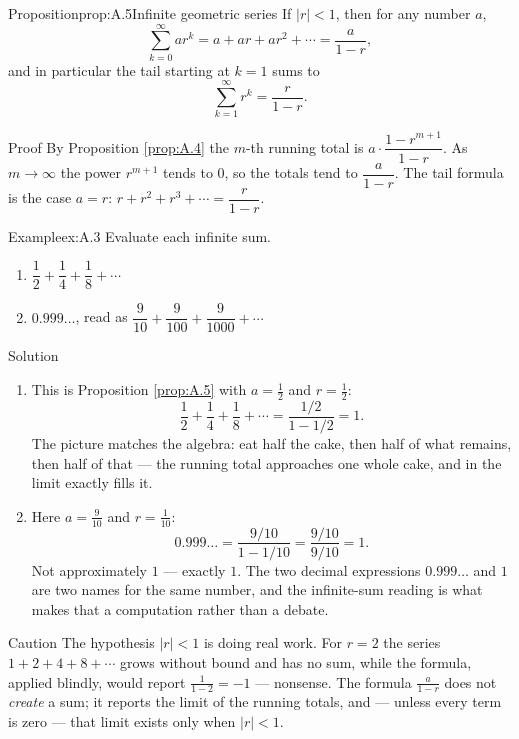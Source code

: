 \documentclass[a4paper,12pt,oneside]{memoir}
\begin{document}
\begin{envproposition}{Proposition}{prop:A.5}{Infinite geometric series}
If \(\lvert r \rvert < 1\), then for any number \(a\), \[ \sum_{k = 0}^{\infty} a r^{k} = a + ar + ar^{2} + \cdots = \frac{a}{1 - r}, \] and in particular the tail starting at \(k = 1\) sums to \[ \sum_{k = 1}^{\infty} r^{k} = \frac{r}{1 - r}. \]
\end{envproposition}
\begin{envproof}{Proof}{}{}
By Proposition \ref{prop:A.4} the \(m\)-th running total is \(a \cdot \dfrac{1 - r^{m+1}}{1 - r}\). As \(m \to \infty\) the power \(r^{m+1}\) tends to \(0\), so the totals tend to \(\dfrac{a}{1 - r}\). The tail formula is the case \(a = r\): \(r + r^{2} + r^{3} + \cdots = \dfrac{r}{1 - r}\). \qedmark
\end{envproof}
\begin{workedexample}
\begin{envexample}{Example}{ex:A.3}{}
Evaluate each infinite sum.

\begin{enumerate}
  \item \(\dfrac{1}{2} + \dfrac{1}{4} + \dfrac{1}{8} + \cdots\)
  \item \(0.999\ldots\), read as \(\dfrac{9}{10} + \dfrac{9}{100} + \dfrac{9}{1000} + \cdots\)
\end{enumerate}
\end{envexample}
\begin{envsolution}{Solution}{}{}
\begin{enumerate}
  \item This is Proposition \ref{prop:A.5} with \(a = \tfrac{1}{2}\) and \(r = \tfrac{1}{2}\): \[ \frac{1}{2} + \frac{1}{4} + \frac{1}{8} + \cdots = \frac{1/2}{1 - 1/2} = 1. \] The picture matches the algebra: eat half the cake, then half of what remains, then half of that — the running total approaches one whole cake, and in the limit exactly fills it.
  \item Here \(a = \tfrac{9}{10}\) and \(r = \tfrac{1}{10}\): \[ 0.999\ldots = \frac{9/10}{1 - 1/10} = \frac{9/10}{9/10} = 1. \] Not approximately \(1\) — exactly \(1\). The two decimal expressions \(0.999\ldots\) and \(1\) are two names for the same number, and the infinite-sum reading is what makes that a computation rather than a debate.
\end{enumerate}
\end{envsolution}
\end{workedexample}
\begin{envcaution}{Caution}{}{}
The hypothesis \(\lvert r \rvert < 1\) is doing real work. For \(r = 2\) the series \(1 + 2 + 4 + 8 + \cdots\) grows without bound and has no sum, while the formula, applied blindly, would report \(\frac{1}{1 - 2} = -1\) — nonsense. The formula \(\frac{a}{1 - r}\) does not \emph{create} a sum; it reports the limit of the running totals, and — unless every term is zero — that limit exists only when \(\lvert r \rvert < 1\).
\end{envcaution}
\end{document}
